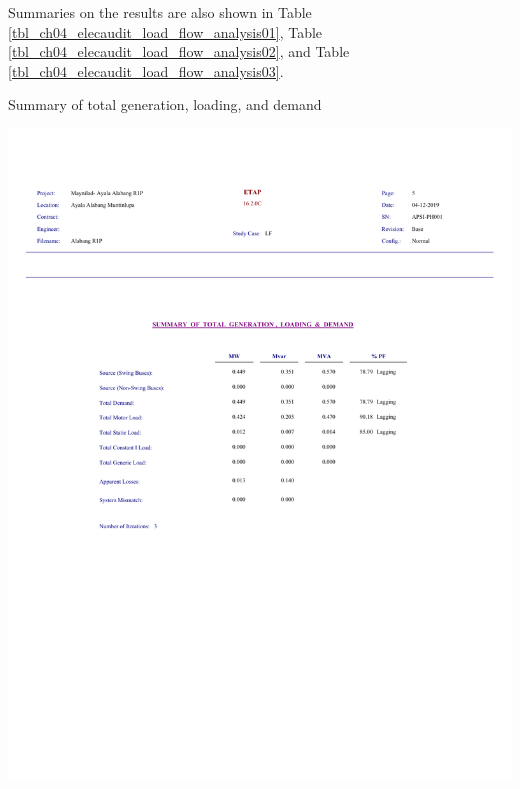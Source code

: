 Summaries on the results are also shown in Table \ref{tbl_ch04_elecaudit_load_flow_analysis01}, Table \ref{tbl_ch04_elecaudit_load_flow_analysis02}, and Table \ref{tbl_ch04_elecaudit_load_flow_analysis03}.


\begin{table}[]
	\caption{Summary of total generation, loading, and demand}
	\label{tbl_ch04_elecaudit_load_flow_analysis01}
	\includegraphics[width=\textwidth]{tables/tbl_ch04_elecaudit_load_flow_analysis01.pdf}		
\end{table}


